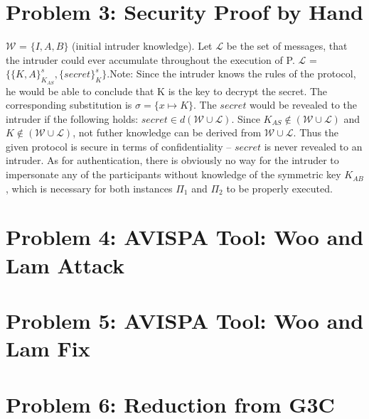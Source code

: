 \documentclass[12pt,pdftex,a4paper]{article}
\begin{document}
\section*{Problem 3: Security Proof by Hand}
$\mathcal{W}$ = $\{I, A, B\}$ (initial intruder knowledge). Let $\mathcal{L}$ be the set of messages, that the intruder could ever accumulate throughout the execution of P. $\mathcal{L}$ = $\{\{K, A\}_{K_{AS}}^s, \{secret\}_K^s\}$.\newline Note: Since the intruder knows the rules of the protocol, he would be able to conclude that K is the key to decrypt the secret. The corresponding substitution is $\sigma = \{x\mapsto K\}$.\newline
The $secret$ would be revealed to the intruder if the following holds: $secret\in d(\mathcal{W}\cup\mathcal{L})$. Since $K_{AS} \notin (\mathcal{W}\cup\mathcal{L})$ and $K \notin (\mathcal{W}\cup\mathcal{L})$, not futher knowledge can be derived from $\mathcal{W}\cup\mathcal{L}$. Thus the given protocol is secure in terms of confidentiality -- $secret$ is never revealed to an intruder. \newline
As for authentication, there is obviously no way for the intruder to impersonate any of the participants without knowledge of the symmetric key $K_{AB}$, which is necessary for both instances $\Pi_1$ and $\Pi_2$ to be properly executed.

\section*{Problem 4: AVISPA Tool: Woo and Lam Attack}

\section*{Problem 5: AVISPA Tool: Woo and Lam Fix}

\section*{Problem 6: Reduction from G3C}
\end{document}
